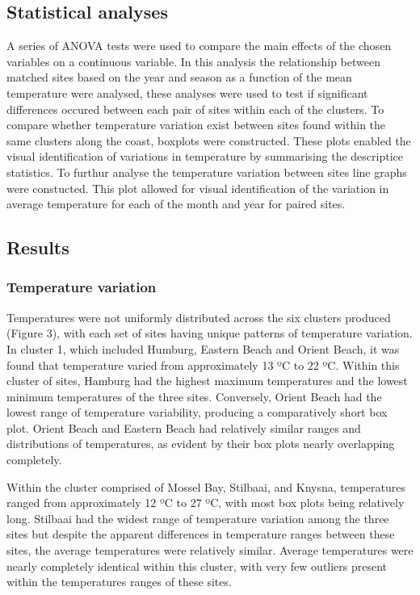 \documentclass[12pt,]{article}
\begin{document}
\subsection{Statistical analyses}\label{statistical-analyses}

A series of ANOVA tests were used to compare the main effects of the
chosen variables on a continuous variable. In this analysis the
relationship between matched sites based on the year and season as a
function of the mean temperature were analysed, these analyses were used
to test if significant differences occured between each pair of sites
within each of the clusters. To compare whether temperature variation
exist between sites found within the same clusters along the coast,
boxplots were constructed. These plots enabled the visual identification
of variations in temperature by summarising the descriptice statistics.
To furthur analyse the temperature variation between sites line graphs
were constucted. This plot allowed for visual identification of the
variation in average temperature for each of the month and year for
paired sites.

\subsection{Results}\label{results}

\subsubsection{Temperature variation}\label{temperature-variation}

Temperatures were not uniformly distributed across the six clusters
produced (Figure 3), with each set of sites having unique patterns of
temperature variation. In cluster 1, which included Humburg, Eastern
Beach and Orient Beach, it was found that temperature varied from
approximately 13 ºC to 22 ºC. Within this cluster of sites, Hamburg had
the highest maximum temperatures and the lowest minimum temperatures of
the three sites. Conversely, Orient Beach had the lowest range of
temperature variability, producing a comparatively short box plot.
Orient Beach and Eastern Beach had relatively similar ranges and
distributions of temperatures, as evident by their box plots nearly
overlapping completely.

Within the cluster comprised of Mossel Bay, Stilbaai, and Knysna,
temperatures ranged from approximately 12 ºC to 27 ºC, with most box
plots being relatively long. Stilbaai had the widest range of
temperature variation among the three sites but despite the apparent
differences in temperature ranges between these sites, the average
temperatures were relatively similar. Average temperatures were nearly
completely identical within this cluster, with very few outliers present
within the temperatures ranges of these sites.
\end{document}

